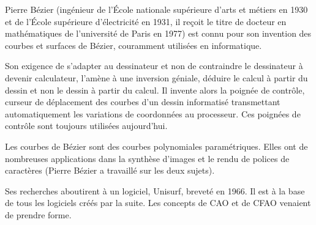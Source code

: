 \medskip
\begin{histoire}%
Pierre Bézier (ingénieur de l'École nationale supérieure d'arts et métiers en 1930 et de l'École 
supérieure d'électricité en 1931, il reçoit le titre de docteur en mathématiques de l'université de Paris 
en 1977) est connu pour son invention des courbes et surfaces de Bézier, couramment utilisées 
en informatique.

\medskip
{}

Son exigence de s'adapter au dessinateur et non de contraindre le dessinateur à devenir calculateur, 
l'amène à une inversion géniale, déduire le calcul à partir du dessin et non le dessin à partir du calcul. 
Il invente alors la poignée de contrôle, curseur de déplacement des courbes d'un dessin informatisé 
transmettant automatiquement les variations de coordonnées au processeur. 
Ces poignées de contrôle sont toujours utilisées aujourd'hui. 

\medskip
Les courbes de Bézier sont des courbes polynomiales paramétriques. 
Elles ont de nombreuses applications dans la synthèse d'images et le rendu de polices de caractères
(Pierre Bézier a travaillé sur les deux sujets). 

Ses recherches aboutirent à un logiciel, Unisurf, breveté en 1966. 
Il est à la base de tous les logiciels créés par la suite. 
Les concepts de CAO et de CFAO venaient de prendre forme.


\end{histoire}
